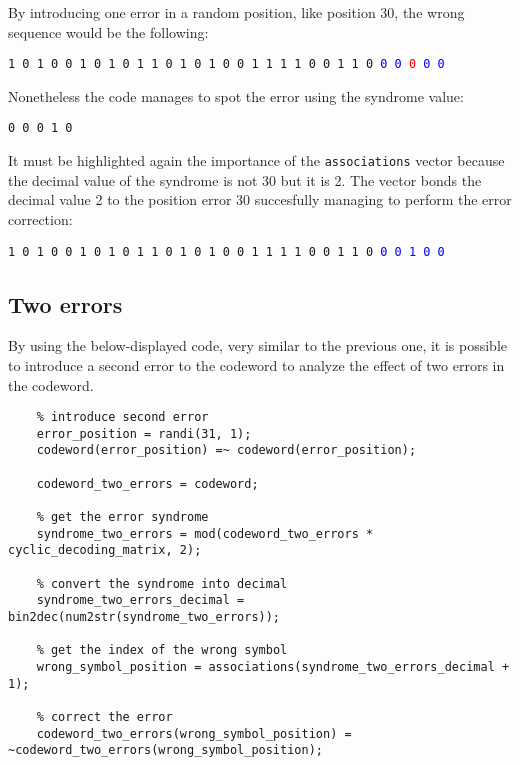 \noindent By introducing one error in a random position, like position 30, the wrong sequence would be the following:

\begin{center}
    \texttt{1 0 1 0 0 1 0 1 0 1 1 0 1 0 1 0 0 1 1 1 1 0 0 1 1 0 }\textcolor{blue}{\texttt{0 0 }}\textcolor{red}{\texttt{0 }}\textcolor{blue}{\texttt{0 0}}
\end{center}

\noindent Nonetheless the code manages to spot the error using the syndrome value:

\begin{center}
    \texttt{0 0 0 1 0}
\end{center}

\noindent It must be highlighted again the importance of the \texttt{associations} vector because the decimal value of the syndrome is not 30 but it is 2. The vector bonds the decimal value 2 to the position error 30 succesfully managing to perform the error correction:
\begin{center}
    \texttt{1 0 1 0 0 1 0 1 0 1 1 0 1 0 1 0 0 1 1 1 1 0 0 1 1 0 }\textcolor{blue}{\texttt{0 0 1 0 0}}
\end{center}


\subsection{Two errors} \label{two-errors-correction}
By using the below-displayed code, very similar to the previous one, it is possible to introduce a second error to the codeword to analyze the effect of two errors in the codeword. 

\begin{lstlisting}
    % introduce second error
    error_position = randi(31, 1);
    codeword(error_position) =~ codeword(error_position);

    codeword_two_errors = codeword;

    % get the error syndrome
    syndrome_two_errors = mod(codeword_two_errors * cyclic_decoding_matrix, 2);

    % convert the syndrome into decimal
    syndrome_two_errors_decimal = bin2dec(num2str(syndrome_two_errors));

    % get the index of the wrong symbol
    wrong_symbol_position = associations(syndrome_two_errors_decimal + 1);

    % correct the error
    codeword_two_errors(wrong_symbol_position) = ~codeword_two_errors(wrong_symbol_position);
\end{lstlisting}


